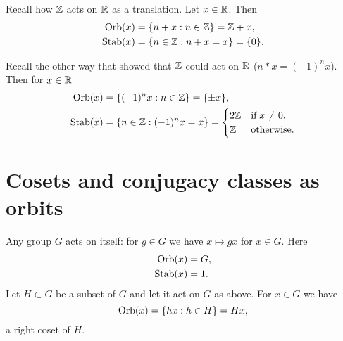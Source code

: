 
\begin{example}
    Recall how $\mathbb{Z}$ acts on $\mathbb{R}$ as a translation.
    Let $x \in \mathbb{R}$.
    Then
    \begin{align*}
        \operatorname{Orb}(x)  &= \{n + x : n \in \mathbb{Z}\} = \mathbb{Z} + x, \\
        \operatorname{Stab}(x) &= \{n \in \mathbb{Z}: n + x = x\} = \{0\}.
    \end{align*}
\end{example}

\begin{example}
    Recall the other way that showed that $\mathbb{Z}$ could act on $\mathbb{R}$ ($n * x = (-1)^n x$).
    Then for $x \in \mathbb{R}$
    \begin{align*}
        \operatorname{Orb}(x)  &= \{(-1)^n x: n \in \mathbb{Z}\} = \{\pm x\}, \\
        \operatorname{Stab}(x) &= \{n \in \mathbb{Z}: (-1)^nx = x\} =
        \begin{cases}
            2\mathbb{Z} & \text{if}\; x \neq 0, \\
            \mathbb{Z}  & \text{otherwise}.
        \end{cases}
    \end{align*}
\end{example}

%
%

\section{Cosets and conjugacy classes as orbits}

Any group $G$ acts on itself:
for $g \in G$ we have $x \mapsto gx$ for $x \in G$.
Here
\begin{align*}
    \operatorname{Orb}(x)  &= G, \\
    \operatorname{Stab}(x) &= 1.
\end{align*}
Let $H \subset G$ be a subset of $G$ and let it act on $G$ as above.
For $x \in G$ we have
\[
    \operatorname{Orb}(x) = \{hx: h \in H\} = Hx,
\]
a right coset of $H$.

